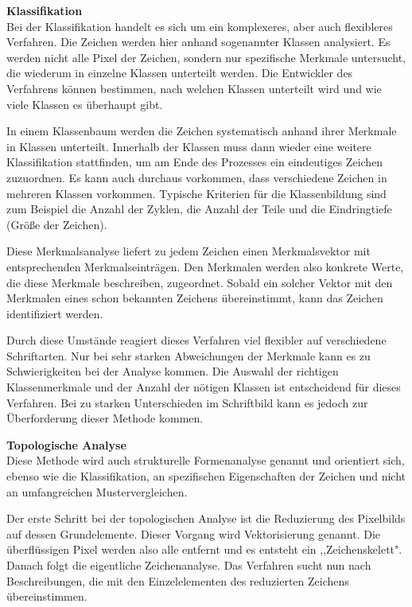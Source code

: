 \textbf{Klassifikation}\\
Bei der Klassifikation handelt es sich um ein komplexeres, aber auch flexibleres Verfahren. Die Zeichen werden hier anhand sogenannter Klassen analysiert. Es werden nicht alle Pixel der Zeichen, sondern nur spezifische Merkmale untersucht, die wiederum in einzelne Klassen unterteilt werden. Die Entwickler des Verfahrens können bestimmen, nach welchen Klassen unterteilt wird und wie viele Klassen es überhaupt gibt. \cite{OCRB}


In einem Klassenbaum werden die Zeichen systematisch anhand ihrer Merkmale in Klassen unterteilt. Innerhalb der Klassen muss dann wieder eine weitere Klassifikation stattfinden, um am Ende des Prozesses ein eindeutiges Zeichen zuzuordnen. Es kann auch durchaus vorkommen, dass verschiedene Zeichen in mehreren Klassen vorkommen. Typische Kriterien für die Klassenbildung sind zum Beispiel die Anzahl der Zyklen, die Anzahl der Teile und die Eindringtiefe (Größe der Zeichen). \cite{OCRB}

Diese Merkmalsanalyse liefert zu jedem Zeichen einen Merkmalsvektor mit entsprechenden Merkmalseinträgen. Den Merkmalen werden also konkrete Werte, die diese Merkmale beschreiben, zugeordnet. Sobald ein solcher Vektor mit den Merkmalen eines schon bekannten Zeichens übereinstimmt, kann das Zeichen identifiziert werden. \cite{OCRB}

Durch diese Umstände reagiert dieses Verfahren viel flexibler auf verschiedene Schriftarten. Nur bei sehr starken Abweichungen der Merkmale kann es zu Schwierigkeiten bei der Analyse kommen. Die Auswahl der richtigen Klassenmerkmale und der Anzahl der nötigen Klassen ist entscheidend für dieses Verfahren. Bei zu starken Unterschieden im Schriftbild kann es jedoch zur Überforderung dieser Methode kommen. \cite{OCRB}

\textbf{Topologische Analyse}\\
Diese Methode wird auch strukturelle Formenanalyse genannt und orientiert sich, ebenso wie die Klassifikation, an spezifischen Eigenschaften der Zeichen und nicht an umfangreichen Mustervergleichen. \cite{OCRB}

Der erste Schritt bei der topologischen Analyse ist die Reduzierung des Pixelbilds auf dessen Grundelemente. Dieser Vorgang wird Vektorisierung genannt. Die überflüssigen Pixel werden also alle entfernt und es entsteht ein ,,Zeichenskelett". Danach folgt die eigentliche Zeichenanalyse. Das Verfahren sucht nun nach Beschreibungen, die mit den Einzelelementen des reduzierten Zeichens übereinstimmen. \cite{OCRB}


